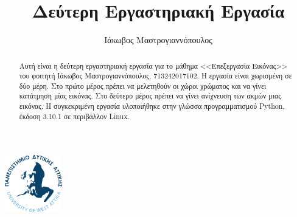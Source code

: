 \documentclass[
  11pt,
  singlespacing,
  liststotoc,
  toctotoc,
  headspline
]{fphw}
\title{Δεύτερη Εργαστηριακή Εργασία}
\author{Ιάκωβος Μαστρογιαννόπουλος}
\institute{Πανεπιστημιο Δυτικης Αττικης \\ Τμημα Μηχανικων Πληροφορικης και Υπολογιστων}
\begin{document}
\includegraphics[width=25mm]{Figures/Logo}
\maketitle

\begin{abstract}
  Αυτή είναι η δεύτερη εργαστηριακή εργασία για το μάθημα <<Επεξεργασία Εικόνας>> του φοιτητή Ιάκωβος Μαστρογιαννόπουλος, 713242017102. Η εργασία είναι χωρισμένη σε δύο μέρη. Στο πρώτο μέρος πρέπει να μελετηθούν οι χώροι χρώματος και να γίνει κατάτμηση μίας εικόνας. Στο δεύτερο μέρος πρέπει να γίνει ανίχνευση των ακμών μιας εικόνας. Η συγκεκριμένη εργασία υλοποιήθηκε στην γλώσσα προγραμματισμού Python, έκδοση 3.10.1 σε περιβάλλον Linux.
\end{abstract}

\newpage
\tableofcontents
\listoffigures
\newpage
\listoftables

\newpage


\end{document}
